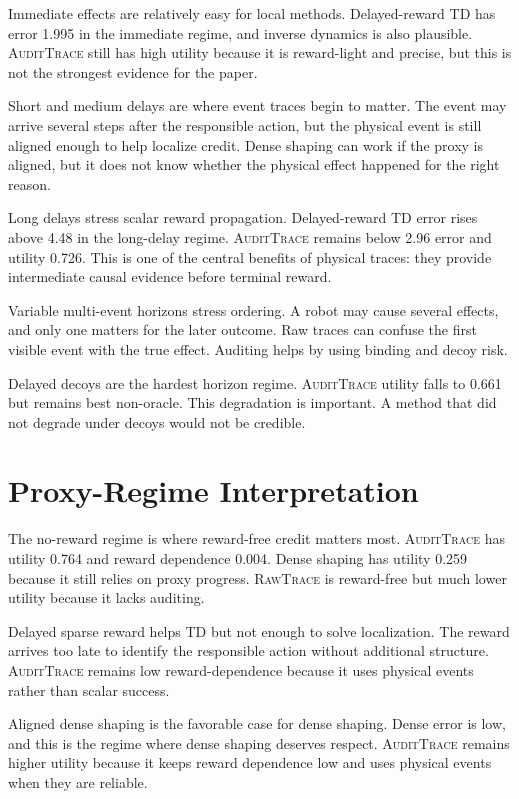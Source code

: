 \documentclass{article}
\newcommand{\method}{\textsc{AuditTrace}\xspace}
\newcommand{\rawtrace}{\textsc{RawTrace}\xspace}
\begin{document}
Immediate effects are relatively easy for local methods. Delayed-reward TD has error 1.995 in the immediate regime, and inverse dynamics is also plausible. \method still has high utility because it is reward-light and precise, but this is not the strongest evidence for the paper.

Short and medium delays are where event traces begin to matter. The event may arrive several steps after the responsible action, but the physical event is still aligned enough to help localize credit. Dense shaping can work if the proxy is aligned, but it does not know whether the physical effect happened for the right reason.

Long delays stress scalar reward propagation. Delayed-reward TD error rises above 4.48 in the long-delay regime. \method remains below 2.96 error and utility 0.726. This is one of the central benefits of physical traces: they provide intermediate causal evidence before terminal reward.

Variable multi-event horizons stress ordering. A robot may cause several effects, and only one matters for the later outcome. Raw traces can confuse the first visible event with the true effect. Auditing helps by using binding and decoy risk.

Delayed decoys are the hardest horizon regime. \method utility falls to 0.661 but remains best non-oracle. This degradation is important. A method that did not degrade under decoys would not be credible.

\section{Proxy-Regime Interpretation}

The no-reward regime is where reward-free credit matters most. \method has utility 0.764 and reward dependence 0.004. Dense shaping has utility 0.259 because it still relies on proxy progress. \rawtrace is reward-free but much lower utility because it lacks auditing.

Delayed sparse reward helps TD but not enough to solve localization. The reward arrives too late to identify the responsible action without additional structure. \method remains low reward-dependence because it uses physical events rather than scalar success.

Aligned dense shaping is the favorable case for dense shaping. Dense error is low, and this is the regime where dense shaping deserves respect. \method remains higher utility because it keeps reward dependence low and uses physical events when they are reliable.
\end{document}
